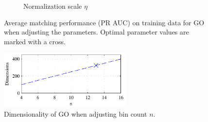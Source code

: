 \documentclass[thesis.tex]{subfiles}
\begin{document}
\begin{figure}[p]
{\begin{subfigure}[t]{0.593\textwidth}
		\caption{Normalization scale $\eta$}
		\label{fig:dtuParametersGo_normSigma}
		\vspace{2mm}
	\end{subfigure}}
	\caption{Average matching performance (PR AUC) on training data for GO when adjusting the parameters. Optimal parameter values are marked with a cross.}
	\label{fig:dtuParametersGoAuc}
	\vspace{1cm}
	\includegraphics[width=0.593\textwidth]{img/dtuParametersGo_binCountDims.pdf}
	\caption{Dimensionality of GO when adjusting bin count $n$.}
	\label{fig:dtuParametersGoDims}
\end{figure}
%
\end{document}
